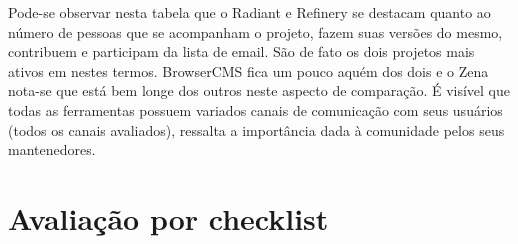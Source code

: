 Pode-se observar nesta tabela que o Radiant e Refinery se destacam quanto ao número de pessoas que se acompanham o projeto, fazem suas versões do mesmo, contribuem e participam da lista de email. São de fato os dois projetos mais ativos em nestes termos. BrowserCMS fica um pouco aquém dos dois e o Zena nota-se que está bem longe dos outros neste aspecto de comparação. É visível que todas as ferramentas possuem variados canais de comunicação com seus usuários (todos os canais avaliados), ressalta a importância dada à comunidade pelos seus mantenedores.

\section{Avaliação por checklist}

